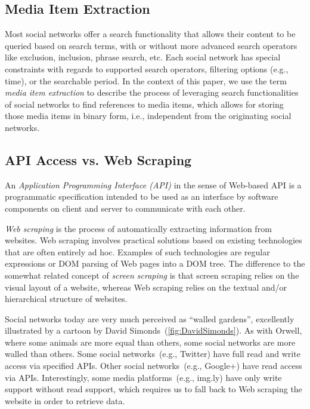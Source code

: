 \documentclass{acm_proc_article-sp}
\let\oldemph\emph
\renewcommand{\emph}[1]{\oldemph{\fontsize{9}{9}\selectfont #1}}
\begin{document}
\subsection{Media Item Extraction}
Most social networks offer a search functionality that allows their content to be queried based on search terms,
with or without more advanced search operators like exclusion, inclusion, phrase search, etc.
Each social network has special constraints with regards to supported search operators,
filtering options (e.g., time), or the searchable period.
In the context of this paper, we use the term \emph{media item extraction} to describe the process of leveraging search functionalities of social networks to find references to media items,
which allows for storing those media items in binary form,
i.e., independent from the originating social networks.

\subsection{API Access vs. Web Scraping}
An \emph{Application Programming Interface (API)} in the sense of Web-based API is a programmatic specification intended to be used as an interface by software components on client and server to communicate with each other.

\emph{Web scraping} is the process of automatically extracting information from websites.
Web scraping involves practical solutions based on existing technologies that are often entirely ad hoc.
Examples of such technologies are regular expressions or DOM parsing of Web pages into a DOM tree.
The difference to the somewhat related concept of \emph{screen scraping} is that screen scraping relies on the visual layout of a website, whereas Web scraping relies on the textual and/or hierarchical structure of websites.

Social networks today are very much perceived as ``walled gardens'', excellently illustrated by a cartoon by David Simonds~(\autoref{fig:DavidSimonds}).
As with Orwell, where some animals are more equal than others, some social networks are more walled than others.
Some social networks~(e.g., Twitter) have full read and write access via specified APIs.
Other social networks~(e.g., Google+) have read access via APIs.
Interestingly, some media platforms~(e.g., img.ly) have only write support without read support, which requires us to fall back to Web scraping the website in order to retrieve data.
\end{document}
